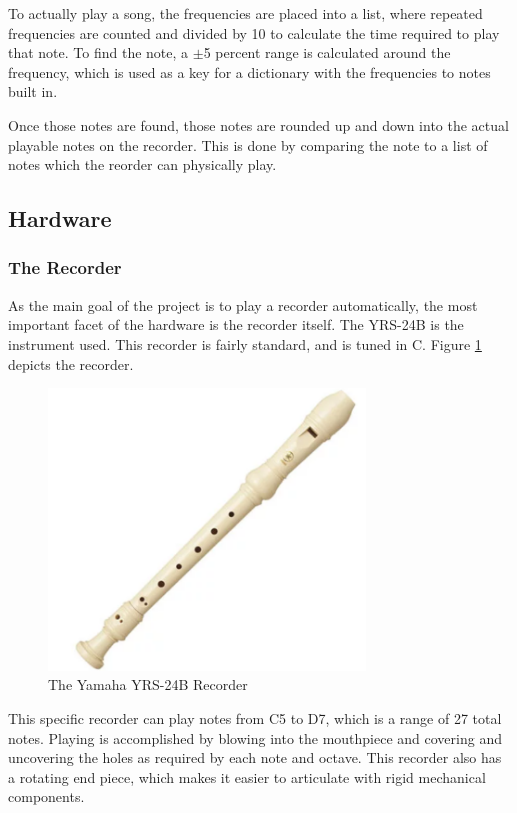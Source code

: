 \documentclass[UTF8, 12pt]{article}
\begin{document}
    To actually play a song, the frequencies are placed into a list, where repeated frequencies are counted and divided by 10 to calculate the time required to play that note. To find the note, a $\pm$5 percent range is calculated around the frequency, which is used as a key for a dictionary with the frequencies to notes built in.

    Once those notes are found, those notes are rounded up and down into the actual playable notes on the recorder. This is done by comparing the note to a list of notes which the reorder can physically play.

\subsection{Hardware}
\subsubsection{The Recorder}
    As the main goal of the project is to play a recorder automatically, the most important facet of the hardware is the recorder itself. The YRS-24B is the instrument used. This recorder is fairly standard, and is tuned in C. Figure \ref{rec} depicts the recorder.
    \begin{figure}[h]
        \centering
        \includegraphics[width=0.75\textwidth]{recorder.png}
        \caption{The Yamaha YRS-24B Recorder}
        \label{rec}
    \end{figure}
    This specific recorder can play notes from C5 to D7, which is a range of 27 total notes. Playing is accomplished by blowing into the mouthpiece and covering and uncovering the holes as required by each note and octave. This recorder also has a rotating end piece, which makes it easier to articulate with rigid mechanical components.
    \newpage
\end{document}
